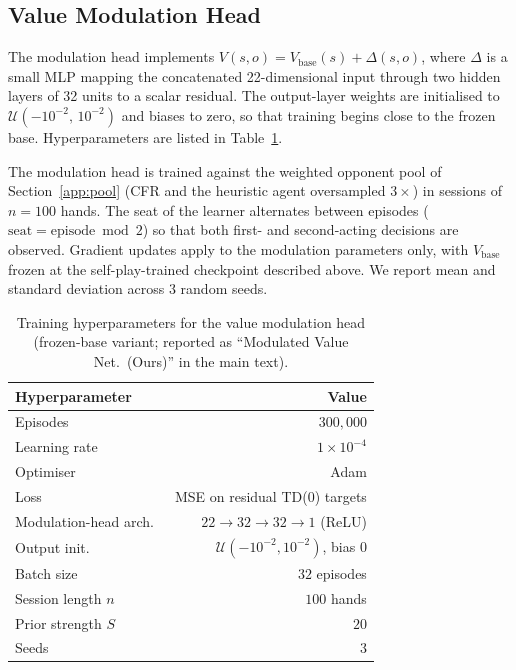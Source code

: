 \subsection{Value Modulation Head}

The modulation head implements
$V(s,o) = V_{\text{base}}(s) + \Delta(s,o)$, where $\Delta$ is a small MLP
mapping the concatenated 22-dimensional input through two hidden layers of
32 units to a scalar residual. The output-layer weights are initialised to
$\mathcal{U}(-10^{-2},\,10^{-2})$ and biases to zero, so that training
begins close to the frozen base. Hyperparameters are listed in
Table~\ref{tab:mod-hyper}.

The modulation head is trained against the weighted opponent pool of
Section~\ref{app:pool} (CFR and the heuristic agent oversampled $3\times$)
in sessions of $n = 100$ hands. The seat of the learner alternates between
episodes ($\text{seat} = \text{episode} \bmod 2$) so that both first- and
second-acting decisions are observed. Gradient updates apply to the
modulation parameters only, with $V_{\text{base}}$ frozen at the
self-play-trained checkpoint described above. We report mean and standard
deviation across $3$ random seeds.

\begin{table}[h]
\centering
\caption{Training hyperparameters for the value modulation head
(frozen-base variant; reported as ``Modulated Value Net.\ (Ours)''
in the main text).}
\label{tab:mod-hyper}
\begin{tabular}{lr}
\toprule
\textbf{Hyperparameter} & \textbf{Value} \\
\midrule
Episodes              & $300{,}000$             \\
Learning rate         & $1\times 10^{-4}$       \\
Optimiser             & Adam                    \\
Loss                  & MSE on residual TD(0) targets \\
Modulation-head arch.\ & $22 \to 32 \to 32 \to 1$ (ReLU) \\
Output init.          & $\mathcal{U}(-10^{-2},10^{-2})$, bias $0$ \\
Batch size            & $32$ episodes           \\
Session length $n$    & $100$ hands             \\
Prior strength $S$    & $20$                    \\
Seeds                 & $3$                     \\
\bottomrule
\end{tabular}
\end{table}

